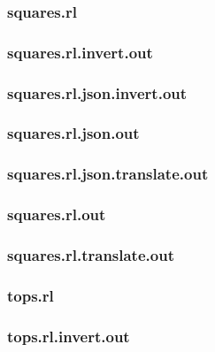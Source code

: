 \subsubsection{squares.rl}
\label{app:squares_rl}

\subsubsection{squares.rl.invert.out}
\label{app:squares_rl.invert.out}

\subsubsection{squares.rl.json.invert.out}
\label{app:squares_rl.json.invert.out}

\subsubsection{squares.rl.json.out}
\label{app:squares_rl.json.out}

\subsubsection{squares.rl.json.translate.out}
\label{app:squares_rl.json.translate.out}

\subsubsection{squares.rl.out}
\label{app:squares_rl.out}

\subsubsection{squares.rl.translate.out}
\label{app:squares_rl.translate.out}

\subsubsection{tops.rl}
\label{app:tops_rl}

\subsubsection{tops.rl.invert.out}
\label{app:tops_rl.invert.out}


